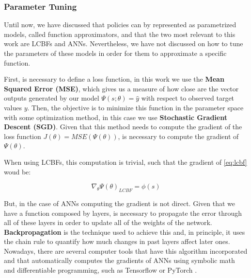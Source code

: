 \subsubsection{Parameter Tuning}

Until now, we have discussed that policies can by represented as parametrized models, called function approximators, and that the two most relevant to this work are LCBFs and ANNs. Nevertheless, we have not discussed on how to tune the parameters of these models in order for them to approximate a specific function.

First, is necessary to define a loss function, in this work we use the \textbf{Mean Squared Error (MSE)}, which gives us a measure of how close are the vector outputs generated by our model $\Psi(s;\theta)=\hat{y}$ with respect to observed target values $y$. Then, the objective is to minimize this function in the parameter space with some optimization method, in this case we use \textbf{Stochastic Gradient Descent (SGD)}. Given that this method needs to compute the gradient of the loss function $J(\theta)=MSE(\Psi(\theta))$, is necessary to compute the gradient of $\Psi(\theta)$.

When using LCBFs, this computation is trivial, such that the gradient of \ref{eq:lcbf} woud be:

\begin{equation}
    \nabla_{\theta} \Psi(\theta)_{LCBF} = \phi(s)
\end{equation}

But, in the case of ANNs computing the gradient is not direct. Given that we have a function composed by layers, is necessary to propagate the error through all of these layers in order to update all of the weights of the network. \textbf{Backpropagation} \cite{rumelhart1988learning} is the technique used to achieve this and, in principle, it uses the chain rule to quantify how much changes in past layers affect later ones. Nowadays, there are several computer tools that have this algorithm incorporated and that automatically computes the gradients of ANNs using symbolic math and differentiable programming, such as Tensorflow \cite{tensorflow2015-whitepaper} or PyTorch \cite{paszke2017automatic}.

